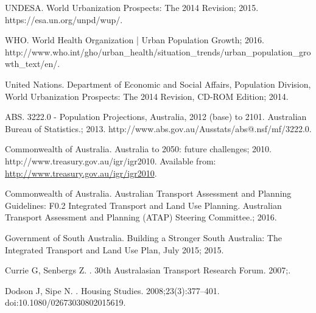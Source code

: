 \documentclass[10pt,letterpaper]{article}
\begin{document}
%
%
% 
\begin{thebibliography}{}



UNDESA. {World Urbanization Prospects: The 2014 Revision}; 2015.
\newblock https://esa.un.org/unpd/wup/.

WHO. {World Health Organization | Urban Population Growth}; 2016.
\newblock
  http://www.who.int/gho/urban{\_}health/situation{\_}trends/urban{\_}population{\_}growth{\_}text/en/.

{United Nations}. {Department of Economic and Social Affairs, Population
  Division, World Urbanization Prospects: The 2014 Revision, CD-ROM Edition};
  2014.

ABS. {3222.0 - Population Projections, Australia, 2012 (base) to 2101.
  Australian Bureau of Statistics.}; 2013.
\newblock http://www.abs.gov.au/Ausstats/abs@.nsf/mf/3222.0.

{Commonwealth of Australia}. {Australia to 2050: future challenges}; 2010.
\newblock http://www.treasury.gov.au/igr/igr2010.
\newblock Available from: \url{http://www.treasury.gov.au/igr/igr2010}.

{Commonwealth of Australia}. {Australian Transport Assessment and Planning
  Guidelines: F0.2 Integrated Transport and Land Use Planning. Australian
  Transport Assessment and Planning (ATAP) Steering Committee.}; 2016.

{Government of South Australia}. {Building a Stronger South Australia: The
  Integrated Transport and Land Use Plan, July 2015}; 2015.

Currie G, Senbergs Z.
.
\newblock 30th Australasian Transport Research Forum. 2007;.

Dodson J, Sipe N.
.
\newblock Housing Studies. 2008;23(3):377--401.
\newblock doi:{10.1080/02673030802015619}.


\end{thebibliography}
\end{document}

